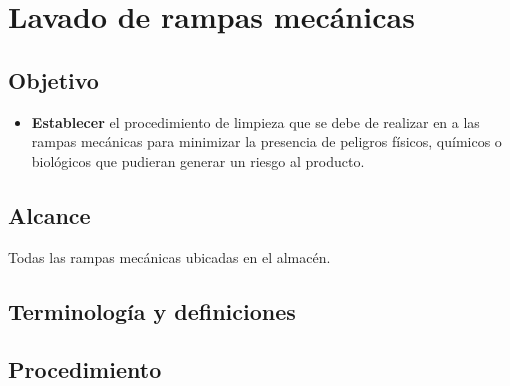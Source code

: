 \thispagestyle{formato-PI}
\renewcommand{\MayorVer}{2}
\renewcommand{\MenorVer}{0}
\renewcommand{\Codigo}{HYS-4-IT}
\renewcommand{\FechaPub}{2023--01}
\renewcommand{\Titulo}{Lavado de rampas mecánicas}

\section{\Titulo}


\subsection{Objetivo}

\begin{itemize}
	\item \textbf{Establecer} el procedimiento de limpieza que se debe de realizar en a las rampas mecánicas para minimizar la presencia de peligros físicos, químicos o biológicos que pudieran generar un riesgo al producto.
\end{itemize}

\subsection{Alcance}
Todas las rampas mecánicas ubicadas en el almacén.

\subsection{Terminología y definiciones}

\begin{description}
\end{description}



\subsection{Procedimiento}
